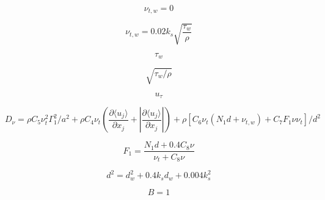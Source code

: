 \begin{equation}
\nu_{t,w} = 0
\end{equation}

\begin{equation}
\nu_{t,w} = 0.02 k_s \sqrt{\frac{\tau_w}{\rho}}
\end{equation}

\begin{equation}
\tau_w
\end{equation}

\begin{equation}
\sqrt{\tau_w / \rho}
\end{equation}

\begin{equation}
u_{\tau}
\end{equation}

\begin{equation}
D_{\nu} = \rho C_5 \nu_t^2 \Gamma_1^2 / a^2 +
\rho C_4 \nu_t \left( \frac{\partial \langle u_j \rangle}{\partial x_j} +
\left| \frac{\partial \langle u_j \rangle}{\partial x_j} \right| \right) +
\rho \left[ C_6 \nu_t ( N_1 d + \nu_{t,w}) + C_7 F_1 \nu \nu_t \right] / d^2
\end{equation}

\begin{equation}
F_1 = \frac{N_1 d + 0.4 C_8 \nu}{\nu_t + C_8 \nu}
\end{equation}

\begin{equation}
d^2 = d_w^2 + 0.4 k_s d_w + 0.004 k_s^2
\end{equation}

\begin{equation}
B=1
\end{equation}


